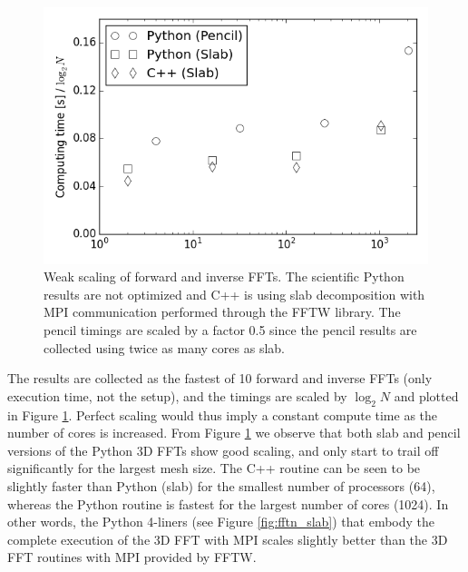 \documentclass[final,3p,times,twocolumn]{elsarticle}
\newcommand{\inpyth}{\lstinline[style=inlinestyle]} %[]%
\begin{document}


\begin{figure}[ht!]
\centering
\includegraphics[scale=0.48]{weak_scaling_fft_1024.png}
\caption{Weak scaling of forward and inverse FFTs. The scientific Python 
results are not optimized and C++ is using slab 
decomposition with MPI communication performed through the FFTW library. The 
pencil timings are scaled by a factor 0.5 since the pencil results are 
collected using twice as many cores as slab.}
\label{fig:weak_FFT_scaling}
\end{figure}

The results are collected as the fastest of 10 forward and inverse FFTs (only 
execution time, not the setup), and the timings
are scaled by $\log_2N$ and plotted in Figure \ref{fig:weak_FFT_scaling}. 
Perfect scaling would thus imply a constant compute time as the number of cores 
is increased. From Figure \ref{fig:weak_FFT_scaling} we observe that both slab 
and pencil versions of the Python 3D FFTs show good scaling,
and only start to trail off significantly for the largest mesh size. The C++ 
routine can be seen to be slightly faster than Python (slab) for the 
smallest number of processors (64), whereas the Python routine is fastest for 
the largest number of cores (1024). In other words, the Python 4-liners (see 
Figure \ref{fig:fftn_slab}) that embody the complete execution of the 3D FFT 
with MPI scales slightly better than the 3D FFT routines with MPI provided by 
FFTW.  
\end{document}
